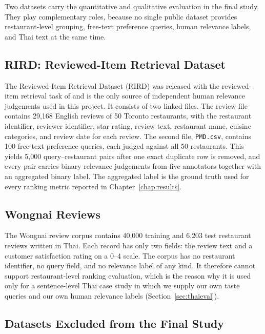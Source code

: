 Two datasets carry the quantitative and qualitative evaluation in the final study. They play complementary roles, because no single public dataset provides restaurant-level grouping, free-text preference queries, human relevance labels, and Thai text at the same time.

\subsection{RIRD: Reviewed-Item Retrieval Dataset}
\label{sec:rird}

The Reviewed-Item Retrieval Dataset (RIRD) was released with the reviewed-item retrieval task of \citet{abdollahpour2023} and is the only source of independent human relevance judgements used in this project. It consists of two linked files. The review file contains 29,168 English reviews of 50 Toronto restaurants, with the restaurant identifier, reviewer identifier, star rating, review text, restaurant name, cuisine categories, and review date for each review. The second file, \texttt{PMD.csv}, contains 100 free-text preference queries, each judged against all 50 restaurants. This yields 5,000 query--restaurant pairs after one exact duplicate row is removed, and every pair carries binary relevance judgements from five annotators together with an aggregated binary label. The aggregated label is the ground truth used for every ranking metric reported in Chapter~\ref{chap:results}.

\subsection{Wongnai Reviews}
\label{sec:wongnai}

The Wongnai review corpus \citep{highgroundbkk} contains 40,000 training and 6,203 test restaurant reviews written in Thai. Each record has only two fields: the review text and a customer satisfaction rating on a 0--4 scale. The corpus has no restaurant identifier, no query field, and no relevance label of any kind. It therefore cannot support restaurant-level ranking evaluation, which is the reason why it is used only for a sentence-level Thai case study in which we supply our own taste queries and our own human relevance labels (Section~\ref{sec:thaieval}).

\subsection{Datasets Excluded from the Final Study}
\label{sec:excluded}

